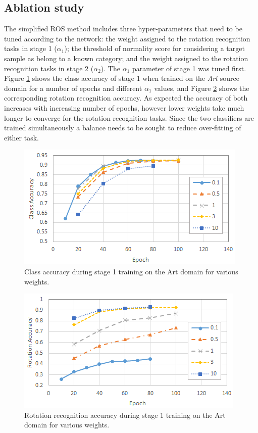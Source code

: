 \documentclass[10pt,twocolumn,letterpaper]{article}
\begin{document}
\subsection{Ablation study}
\label{sec:ablation}

The simplified ROS method includes three hyper-parameters that need to be tuned according to the network: the weight assigned to the rotation recognition tasks in stage 1 ($\alpha_1$); the threshold of normality score for considering a target sample as belong to a known category; and the weight assigned to the rotation recognition tasks in stage 2 ($\alpha_2$). The $\alpha_1$ parameter of stage 1 was tuned first. Figure \ref{fig:ClassAcc} shows the class accuracy of stage 1 when trained on the \textit{Art} source domain for a number of epochs and different $\alpha_1$ values, and Figure \ref{fig:RotAcc} shows the corresponding rotation recognition accuracy. As expected the accuracy of both increases with increasing number of epochs, however lower weights take much longer to converge for the rotation recognition tasks. Since the two classifiers are trained simultaneously a balance needs to be sought to reduce over-fitting of either task.

\begin{figure}[!htb]
  \centering
   \includegraphics[width=0.95\linewidth]{Figures/ClassAcc.png}
   \caption{Class accuracy during stage 1 training on the Art domain for various weights.}
   \label{fig:ClassAcc}
\end{figure}

\begin{figure}[!htb]
  \centering
   \includegraphics[width=0.95\linewidth]{Figures/RotAcc.png}
   \caption{Rotation recognition accuracy during stage 1 training on the Art domain for various weights.}
   \label{fig:RotAcc}
\end{figure}
\end{document}
